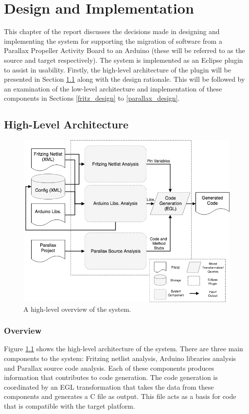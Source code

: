 \documentclass{UoYCSproject}
\begin{document}
\chapter{Design and Implementation} \label{design_and_impl}
This chapter of the report discusses the decisions made in designing and implementing the system for supporting the migration of software from a Parallax Propeller Activity Board to an Arduino (these will be referred to as the source and target respectively). The system is implemented as an Eclipse plugin to assist in usability. Firstly, the high-level architecture of the plugin will be presented in Section \ref{high_lev_arch} along with the design rationale. This will be followed by an examination of the low-level architecture and implementation of these components in Sections \ref{fritz_design} to \ref{parallax_design}.


\section{High-Level Architecture} \label{high_lev_arch}
\begin{figure}[h!]
  \centering
  \includegraphics[width=0.8\linewidth]{graphics/high_level_overview.png}
  \caption{A high-level overview of the system.}
  \label{fig:high_level_overview}
\end{figure}

\subsection{Overview}
Figure \ref{fig:high_level_overview} shows the high-level architecture of the system. There are three main components to the system: Fritzing netlist analysis, Arduino libraries analysis and Parallax source code analysis. Each of these components produces information that contributes to code generation. The code generation is coordinated by an EGL transformation that takes the data from these components and generates a C file as output. This file acts as a basis for code that is compatible with the target platform. 
\end{document}

